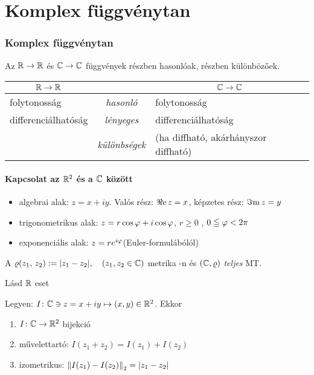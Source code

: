\part{Komplex függvénytan}
\section{Komplex függvénytan}

\begin{megj}Az $\mathbb{R}\to\mathbb{R}$ és $\mathbb{C}\to\mathbb{C}$ függvények részben hasonlóak, részben különbözőek.\\
  
  \begin{tabular}{@{}lcl@{}}\toprule
    \multicolumn{1}{c}{$\mathbb{R}\to\mathbb{R}$} & & \multicolumn{1}{c}{$\mathbb{C}\to\mathbb{C}$}\\\midrule
    folytonosság & \emph{hasonló} & folytonosság\\
    differenciálhatóság & \emph{lényeges} & differenciálhatóság \\
    & \emph{különbségek} & \qquad(ha diffható, akárhányszor diffható)\\
    \bottomrule    
  \end{tabular}
\end{megj}

\subsection{Kapcsolat az $\mathbb{R}^2$ és a $\C$ között}
\begin{itemize}
  \item algebrai alak: $ z = x + iy$. Valós rész: $\operatorname{\Re e} z = x$, képzetes rész: $\operatorname{\Im m} z = y$
  \item trigonometrikus alak: $z= r\cos\varphi + i\cos \varphi$, $r\geq 0$ , $0\leqq \varphi < 2\pi$
  \item exponenciális alak: $z = r e^{i\varphi}$\quad (Euler-formulábólól)
\end{itemize}

\begin{te}[Metrika $\C$-n] A $\varrho(z_1,\,z_2) := |z_1-z_2|,\quad (z_1,z_2\in\mathbb{C})$ metrika \C-n és $(\mathbb{C},\varrho)$ \emph{teljes}
  MT.
\end{te}
\begin{biz} Lásd $\mathbb{R}$ eset
\end{biz}

\begin{te} Legyen: $I\colon \mathbb{C}\owns z=x+iy\mapsto (x,y)\in\mathbb{R}^2$. Ekkor
  \begin{enumerate}
    \item $I\colon\mathbb{C}\to\mathbb{R}^2$ bijekció
    \item művelettartó: $I(z_1 + z_2) = I(z_1) + I(z_2)$
    \item izometrikus: $\left\Vert I(z_1)-I(z_2)\right\Vert_2 = |z_1-z_2|$
    \end{enumerate}
\end{te}

